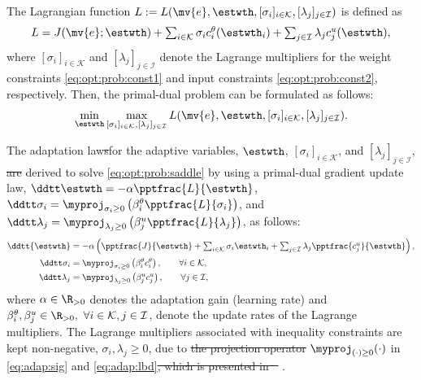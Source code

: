 \documentclass[letterpaper, journal]{IEEEtran}
\providecommand{\DIFadd}[1]{{\protect\color{blue}\uwave{#1}}} %
\providecommand{\DIFdel}[1]{{\protect\color{red}\sout{#1}}} %
\providecommand{\DIFaddbegin}{} %
\providecommand{\DIFaddend}{} %
\providecommand{\DIFdelbegin}{} %
\providecommand{\DIFdelend}{} %
\begin{document}
The Lagrangian function $L:=L(\mv{e},\estwth,[\sigma_i]_{i\in\mathcal{K}},[\lambda_j]_{j\in\mathcal I})$ is defined as
\begin{equation}
  L
  = 
  J(\mv{e};\estwth) 
  + 
  \textstyle\sum_{i\in\mathcal{K}}
  \sigma_{i}
  c^{\theta}_{i}(\estwth_i)
  +
  \textstyle\sum_{j\in\mathcal I}
  \lambda_{j}
  c^{u}_{j}(\estwth)
  ,
  \label{eq:lagrangian}
\end{equation}
where $[\sigma_i]_{i\in\mathcal{K}}$ and $[\lambda_j]_{j\in\mathcal{I}}$ denote the Lagrange multipliers for the weight constraints \eqref{eq:opt:prob:const1} and input constraints \eqref{eq:opt:prob:const2}, respectively.
Then, the primal-dual problem can be formulated as follows:
\begin{equation} \label{eq:opt:prob:saddle}
  \min_{\estwth}
  \max_{
    [\sigma_i]_{i\in\mathcal{K}}
    ,
    [\lambda_j]_{j\in\mathcal{I}}
  } 
  L(\mv{e},\estwth,[\sigma_i]_{i\in\mathcal{K}},[\lambda_j]_{j\in\mathcal I})
  .
\end{equation}

The adaptation law\DIFdelbegin \DIFdel{s}\DIFdelend  for the adaptive variables, $\estwth$, $[\sigma_i]_{i\in\mathcal{K}}$, and $[\lambda_j]_{j\in\mathcal{I}}$, \DIFdelbegin \DIFdel{are }\DIFdelend \DIFaddbegin \DIFadd{is }\DIFaddend derived to solve \eqref{eq:opt:prob:saddle} by using a primal-dual gradient update law, \ie 
$
  \ddtt\estwth 
  = 
  -\alpha \pptfrac{L}{\estwth}
$, $
  \ddtt\sigma_i 
  = 
  \myproj_{\sigma_i\ge0}
  \left(
      \beta_i^\theta 
      \pptfrac{L}{\sigma_i}
  \right)
$, and $
  \ddtt\lambda_j 
  = 
  \myproj_{\lambda_j\ge0}
  \left(
    \beta_j^u 
    \pptfrac{L}{\lambda_j}
  \right)
$, as follows:
\begin{subequations} \label{eq:adap}
  \begin{align}
    \ddtt{\estwth}
    &
    =
    -\alpha 
    \left(
      \pptfrac{J}{\estwth}
      +
      \textstyle\sum_{i\in\mathcal{K}}
      \sigma_i 
      \estwth_i
      +
      \textstyle\sum_{j\in\mathcal{I}}
      \lambda_j 
      \pptfrac{c^{u}_{j}}{\estwth}
    \right),
    \label{eq:adap:th}
    \\
    \ddtt\sigma_i
    & 
    = 
    \myproj_{\sigma_i\ge0}
      \left(
      \beta_i^{\theta}
      c^{\theta}_{i} 
    \right)
    ,
    \qquad \forall i\in\mathcal{K},
    \label{eq:adap:sig}
    \\
    \ddtt\lambda_j
    & 
    = 
    \myproj_{\lambda_j\ge0}
      \left(
      \beta_j^{u}
      c^{u}_{j} 
    \right)
    ,
    \qquad \forall j\in\mathcal{I},
    \label{eq:adap:lbd}
  \end{align}%
\end{subequations}
where $\alpha\in\R_{>0}$ denotes the adaptation gain (learning rate) and $\beta_i^{\theta},\beta_j^{u}\in\R_{>0},\ \forall i\in\mathcal{K},j\in\mathcal{I}$, denote the update rates of the Lagrange multipliers. 
The Lagrange multipliers associated with inequality constraints are kept non-negative, \ie $\sigma_i,\lambda_j\ge 0$, due to \DIFdelbegin \DIFdel{the projection operator }\DIFdelend $\myproj_{(\cdot)\ge0}(\cdot)$ in \eqref{eq:adap:sig} and \eqref{eq:adap:lbd}\DIFdelbegin \DIFdel{, which is presented in \mbox{%
\cite[Appendix E, eq. (E.4)]{Krstic:1995aa}}\hskip0pt%
}\DIFdelend .
\end{document}
